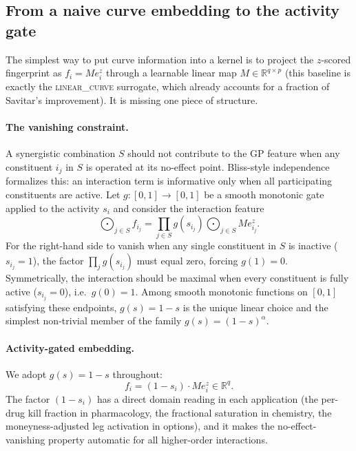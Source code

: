 \documentclass{article}
\begin{document}
\subsection{From a naive curve embedding to the activity gate}

The simplest way to put curve information into a kernel is to project the
$z$-scored fingerprint as $f_i = M e_i^z$ through a learnable linear map
$M \in \mathbb{R}^{q \times p}$ (this baseline is exactly the
\textsc{linear\_curve} surrogate, which already accounts for a fraction of
Savitar's improvement). It is missing one piece of structure.

\paragraph{The vanishing constraint.} A synergistic combination $S$ should
not contribute to the GP feature when any constituent $i_j$ in $S$ is
operated at its no-effect point. Bliss-style independence formalizes this:
an interaction term is informative only when all participating constituents
are active. Let $g: [0,1] \to [0,1]$ be a smooth monotonic gate applied to
the activity $s_i$ and consider the interaction feature
\begin{equation}
\bigodot_{j \in S} f_{i_j}
 = \prod_{j \in S} g(s_{i_j}) \bigodot_{j \in S} M e_{i_j}^z .
\end{equation}
For the right-hand side to vanish when any single constituent in $S$ is
inactive ($s_{i_j} = 1$), the factor $\prod_j g(s_{i_j})$ must equal zero,
forcing $g(1) = 0$. Symmetrically, the interaction should be maximal when
every constituent is fully active ($s_{i_j} = 0$), i.e.\ $g(0) = 1$. Among smooth monotonic functions on $[0,1]$ satisfying these endpoints, $g(s) = 1 - s$ is the unique linear choice and the simplest non-trivial member of the family $g(s) = (1-s)^\alpha$.

\paragraph{Activity-gated embedding.} We adopt $g(s) = 1 - s$ throughout:
\begin{equation}
f_i = (1 - s_i)\cdot M e_i^z \in \mathbb{R}^q .
\label{eq:gate}
\end{equation}
The factor $(1 - s_i)$ has a direct domain reading in each application (the
per-drug kill fraction in pharmacology, the fractional saturation in
chemistry, the moneyness-adjusted leg activation in options), and it makes
the no-effect-vanishing property automatic for all higher-order interactions.
\end{document}
